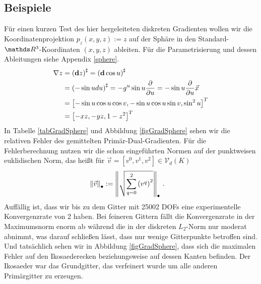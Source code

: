   \subsection{Beispiele}
    \begin{beispiel}[Sphäre]
      Für einen kurzen Test des hier hergeleiteten diskreten Gradienten wollen wir die Koordinatenprojektion
      \( p_{z}(x,y,z):= z \) auf der Sphäre in den Standard-\( \R^{3} \)-Koordinaten \( (x,y,z) \) ableiten.
      Für die Parametrisierung und dessen Ableitungen siehe Appendix \ref{sphere}.
      \begin{align}
        \nabla z &= \left( \mathbf{d} z \right)^{\sharp} = \left( \mathbf{d} \cos u \right)^{\sharp} \\
                 &= \left( -\sin u du \right)^{\sharp} = - g^{u} \sin u \frac{\partial}{\partial u} 
                  = -\sin u \frac{\partial}{\partial u} \vec{x} \\
                  &= \left[ -\sin u \cos u \cos v ,
                           -\sin u \cos u \sin v ,
                           \sin^{2} u \right]^{T} \\
                  &= \left[ -xz, -yz, 1-z^{2} \right]^{T}
      \end{align}
      In Tabelle \ref{tabGradSphere} und Abbildung \ref{figGradSphere} sehen wir die relativen Fehler des
      gemittelten Primär-Dual-Gradienten.
      Für die Fehlerberechnung nutzen wir die schon eingeführten Normen auf der punktweisen euklidischen Norm, das heißt
      für \( \vec{v} = \left[ v^{0}, v^{1}, v^{2} \right] \in \mathcal{V}_{d}(K) \)
      \begin{align}
        \left\|  \vec{v} \right\|_{\bullet} &:= \left\|  \sqrt{\sum_{q=0}^{2} \left( v^{q} \right)^{2}} \right\|_{\bullet}
        \,\text{.}
      \end{align}
      Auffällig ist, dass wir bis zu dem Gitter mit 25002 DOFs eine experimentelle Konvergenzrate von 2 haben. 
      Bei feineren Gittern fällt die Konvergenzrate in der Maximumsnorm enorm ab während die in der 
      diskreten \( L_{2} \)-Norm nur moderat abnimmt,
      was darauf schließen lässt, dass nur wenige Gitterpunkte betroffen sind.
      Und tatsächlich sehen wir in Abbildung \ref{figGradSphere}, dass sich die maximalen Fehler auf den Ikosaederecken
      beziehungsweise auf dessen Kanten befinden.
      Der Ikosaeder war das Grundgitter, das verfeinert wurde um alle anderen Primärgitter zu erzeugen.


\end{beispiel}
